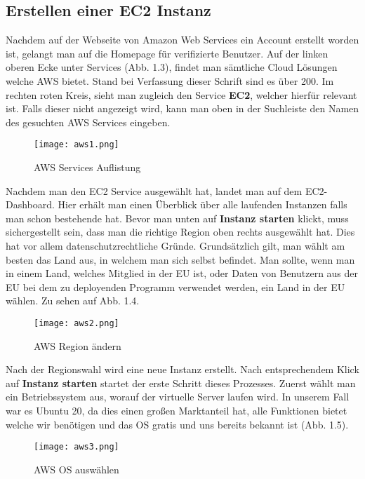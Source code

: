 \subsection{Erstellen einer EC2 Instanz}
Nachdem auf der Webseite von Amazon Web Services ein Account erstellt worden ist, gelangt man auf die Homepage für verifizierte Benutzer. Auf der linken oberen Ecke unter Services (Abb. 1.3), findet man sämtliche Cloud Lösungen welche AWS bietet. Stand bei Verfassung dieser Schrift sind es über 200. Im rechten roten Kreis, sieht man zugleich den Service \textbf{EC2}, welcher hierfür relevant ist. Falls dieser nicht angezeigt wird, kann man oben in der Suchleiste den Namen des gesuchten AWS Services eingeben.
\begin{center}
\begin{figure}[H]
    \centering
    \texttt{[image: aws1.png]}
    \caption{AWS Services Auflistung}
\end{figure}
\end{center}
Nachdem man den EC2 Service ausgewählt hat, landet man auf dem EC2-Dashboard. Hier erhält man einen Überblick über alle laufenden Instanzen falls man schon bestehende hat. Bevor man unten auf \textbf{Instanz starten} klickt, muss sichergestellt sein, dass man die richtige Region oben rechts ausgewählt hat. Dies hat vor allem datenschutzrechtliche Gründe. Grundsätzlich gilt, man wählt am besten das Land aus, in welchem man sich selbst befindet. Man sollte, wenn man in einem Land, welches Mitglied in der EU ist, oder Daten von Benutzern aus der EU bei dem zu deployenden Programm verwendet werden, ein Land in der EU wählen. Zu sehen auf Abb. 1.4.
\begin{center}
\begin{figure}[H]
    \centering
    \texttt{[image: aws2.png]}
    \caption{AWS Region ändern}
\end{figure}
\end{center}
Nach der Regionswahl wird eine neue Instanz erstellt. Nach entsprechendem Klick auf \textbf{Instanz starten} startet der erste Schritt dieses Prozesses. Zuerst wählt man ein Betriebssystem aus, worauf der virtuelle Server laufen wird. In unserem Fall war es Ubuntu 20, da dies einen großen Marktanteil hat, alle Funktionen bietet welche wir benötigen und das OS gratis und uns bereits bekannt ist (Abb. 1.5).
\begin{center}
\begin{figure}[H]
    \centering
    \texttt{[image: aws3.png]}
    \caption{AWS OS auswählen}
\end{figure}
\end{center}
